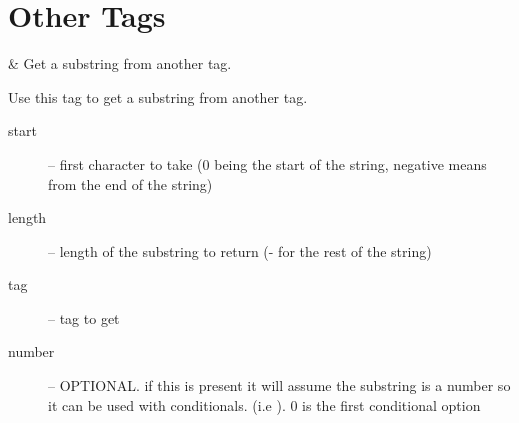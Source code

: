 \section{Other Tags}

\begin{tagmap}
   & Get a substring from another tag.\\
\end{tagmap}
    Use this tag to get a substring from another tag.
\begin{description}
    \item[start] -- first character to take (0 being the start of the string, negative means from the end of the string)
    \item[length] -- length of the substring to return (- for the rest of the string)
    \item[tag] -- tag to get
    \item[number] -- OPTIONAL. if this is present it will assume the
            substring is a number so it can be used with conditionals. (i.e ).
            0 is the first conditional option
\end{description}

